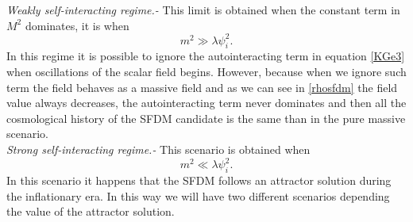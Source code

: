 \documentclass[amssymb,twocolumn,prd,nofootinbib,showpacs]{revtex4-1}
\begin{document}
\textit{Weakly self-interacting regime.-} This limit is obtained when the constant term in $M^2$ dominates, it is when
\begin{equation}\label{consw}
m^2\gg \lambda\psi_i^2.
\end{equation}
In this regime it is possible to ignore the autointeracting term in equation \eqref{KGe3} when oscillations of the scalar field begins. However, because when we ignore such term the field behaves as a massive field and as we can see in \eqref{rhosfdm} the field value always decreases, the autointeracting term never dominates and then all the cosmological history of the SFDM candidate is the same than in the pure massive scenario. 
\\

\textit{Strong self-interacting regime.-} This scenario is obtained when 
\begin{equation}
m^2\ll \lambda\psi_i^2.
\end{equation}
In this scenario it happens that the SFDM follows an attractor solution during the inflationary era. In this way we will have two different scenarios depending the value of the attractor solution.
\\
\end{document}
